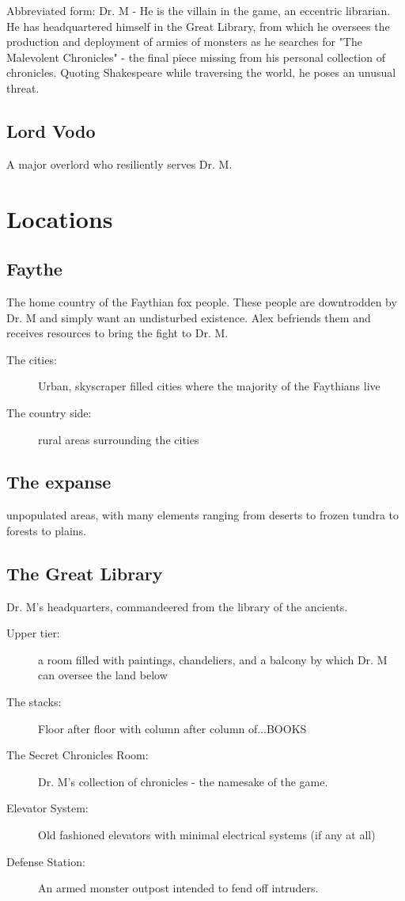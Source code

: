 \documentclass{gd-document}
\begin{document}
Abbreviated form: Dr. M - He is the villain in the game, an eccentric
librarian. He has headquartered himself in the Great Library, from
which he oversees the production and deployment of armies of monsters
as he searches for "The Malevolent Chronicles" - the final piece
missing from his personal collection of chronicles. Quoting
Shakespeare while traversing the world, he poses an unusual threat.

\subsection{Lord Vodo}

A major overlord who resiliently serves Dr. M.

\section{Locations}

\subsection{Faythe}

The home country of the Faythian fox people. These people are
downtrodden by Dr. M and simply want an undisturbed existence. Alex
befriends them and receives resources to bring the fight to Dr. M.

\begin{description}
\item[The cities:] Urban, skyscraper filled cities where the majority
  of the Faythians live
\item[The country side:] rural areas surrounding the cities
\end{description}

\subsection{The expanse}

unpopulated areas, with many elements ranging from deserts to frozen
tundra to forests to plains.

\subsection{The Great Library}

Dr. M's headquarters, commandeered from the library of the ancients.

\begin{description}
\item[Upper tier:] a room filled with paintings, chandeliers, and a
  balcony by which Dr. M can oversee the land below
\item[The stacks:]  Floor after floor with column after column
  of...BOOKS
\item[The Secret Chronicles Room:] Dr. M's collection of chronicles -
  the namesake of the game.
\item[Elevator System:] Old fashioned elevators with minimal
  electrical systems (if any at all)
\item[Defense Station:] An armed monster outpost intended to fend off intruders.
\end{description}
\end{document}
